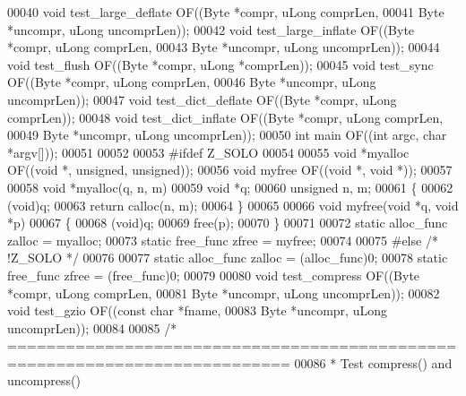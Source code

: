 \begin{DoxyCode}
{00040 \textcolor{keywordtype}{void} test\_large\_deflate OF((Byte *compr, uLong comprLen,
00041                             Byte *uncompr, uLong uncomprLen));
00042 \textcolor{keywordtype}{void} test\_large\_inflate OF((Byte *compr, uLong comprLen,
00043                             Byte *uncompr, uLong uncomprLen));
00044 \textcolor{keywordtype}{void} test\_flush         OF((Byte *compr, uLong *comprLen));
00045 \textcolor{keywordtype}{void} test\_sync          OF((Byte *compr, uLong comprLen,
00046                             Byte *uncompr, uLong uncomprLen));
00047 \textcolor{keywordtype}{void} test\_dict\_deflate  OF((Byte *compr, uLong comprLen));
00048 \textcolor{keywordtype}{void} test\_dict\_inflate  OF((Byte *compr, uLong comprLen,
00049                             Byte *uncompr, uLong uncomprLen));
00050 \textcolor{keywordtype}{int}  main               OF((\textcolor{keywordtype}{int} argc, \textcolor{keywordtype}{char} *argv[]));
00051 
00052 
00053 \textcolor{preprocessor}{#ifdef Z\_SOLO}
00054 
00055 \textcolor{keywordtype}{void} *myalloc OF((\textcolor{keywordtype}{void} *, \textcolor{keywordtype}{unsigned}, \textcolor{keywordtype}{unsigned}));
00056 \textcolor{keywordtype}{void} myfree OF((\textcolor{keywordtype}{void} *, \textcolor{keywordtype}{void} *));
00057 
00058 \textcolor{keywordtype}{void} *myalloc(q, n, m)
00059     \textcolor{keywordtype}{void} *q;
00060     \textcolor{keywordtype}{unsigned} n, m;
00061 \{
00062     (void)q;
00063     \textcolor{keywordflow}{return} calloc(n, m);
00064 \}
00065 
00066 \textcolor{keywordtype}{void} myfree(\textcolor{keywordtype}{void} *q, \textcolor{keywordtype}{void} *p)
00067 \{
00068     (void)q;
00069     free(p);
00070 \}
00071 
00072 \textcolor{keyword}{static} alloc\_func zalloc = myalloc;
00073 \textcolor{keyword}{static} free\_func zfree = myfree;
00074 
00075 \textcolor{preprocessor}{#else }\textcolor{comment}{/* !Z\_SOLO */}\textcolor{preprocessor}{}
00076 
00077 \textcolor{keyword}{static} alloc\_func zalloc = (alloc\_func)0;
00078 \textcolor{keyword}{static} free\_func zfree = (free\_func)0;
00079 
00080 \textcolor{keywordtype}{void} test\_compress      OF((Byte *compr, uLong comprLen,
00081                             Byte *uncompr, uLong uncomprLen));
00082 \textcolor{keywordtype}{void} test\_gzio          OF((\textcolor{keyword}{const} \textcolor{keywordtype}{char} *fname,
00083                             Byte *uncompr, uLong uncomprLen));
00084 
00085 \textcolor{comment}{/* ===========================================================================}
00086 \textcolor{comment}{ * Test compress() and uncompress()}
}
\end{DoxyCode}
